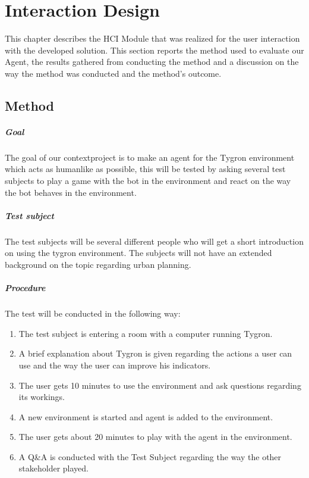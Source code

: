 \chapter{Interaction Design}
This chapter describes the HCI Module that was realized for the user interaction with the developed solution. This section reports the method used to evaluate our Agent, the results gathered from conducting the method and a discussion on the way the method was conducted and the method's outcome.

\section*{Method}

\paragraph{Goal}

The goal of our contextproject is to make an agent for the Tygron environment which acts as humanlike as possible, this will be tested by asking several test subjects to play a game with the bot in the environment and react on the way the bot behaves in the environment.

\paragraph{Test subject}

The test subjects will be several different people who will get a short introduction on using the tygron environment. The subjects will not have an extended background on the topic regarding urban planning.

\paragraph{Procedure}

The test will be conducted in the following way: 
\begin{enumerate}
\item The test subject is entering a room with a computer running Tygron.
\item A brief explanation about Tygron is given regarding the actions a user can use and the way the user can improve his indicators.
\item The user gets 10 minutes to use the environment and ask questions regarding its workings. 
\item A new environment is started and agent is added to the environment.
\item The user gets about 20 minutes to play with the agent in the environment.
\item A Q\&A is conducted with the Test Subject regarding the way the other stakeholder played.
\end{enumerate}

